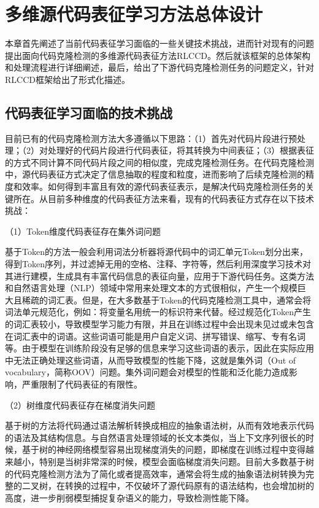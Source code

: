 \chapter{多维源代码表征学习方法总体设计}
\label{chap:design}

本章首先阐述了当前代码表征学习面临的一些关键技术挑战，进而针对现有的问题提出面向代码克隆检测的多维源代码表征方法RLCCD。然后就该框架的总体架构和处理流程进行详细阐述，最后，给出了下游代码克隆检测任务的问题定义，针对RLCCD框架给出了形式化描述。

\section{代码表征学习面临的技术挑战}
\label{sec:challenges}
目前已有的代码克隆检测方法大多遵循以下思路：（1）首先对代码片段进行预处理；（2）对处理好的代码片段进行代码表征，将其转换为中间表征；（3）根据表征的方式不同计算不同代码片段之间的相似度，完成克隆检测任务。在代码克隆检测中，源代码表征方式决定了信息抽取的程度和粒度，进而影响了后续克隆检测的精度和效率。如何得到丰富且有效的源代码表征表示，是解决代码克隆检测任务的关键所在。从目前多种维度的代码表征方法来看，现有的代码表征方式存在以下技术挑战：

（1）Token维度代码表征存在集外词问题

基于Token的方法一般会利用词法分析器将源代码中的词汇单元Token划分出来，得到Token序列，并过滤掉无用的空格、注释、字符等，然后利用深度学习技术对其进行建模，生成具有丰富代码信息的表征向量，应用于下游代码任务。这类方法和自然语言处理（NLP）领域中常用来处理文本的方式很相似，产生一个规模巨大且稀疏的词汇表。但是，在大多数基于Token的代码克隆检测工具中，通常会将词法单元规范化，例如：将变量名用统一的标识符来代替。经过规范化Token产生的词汇表较小，导致模型学习能力有限，并且在训练过程中会出现未见过或未包含在词汇表中的词语。这些词语可能是用户自定义词、拼写错误、缩写、专有名词等。由于模型在训练阶段没有足够的信息来学习这些词语的表示，因此在实际应用中无法正确处理这些词语，从而导致模型的性能下降，这就是集外词（Out of vocabulary，简称OOV）问题。集外词问题会对模型的性能和泛化能力造成影响，严重限制了代码表征的有限性。

（2）树维度代码表征存在梯度消失问题

基于树的方法将代码通过语法解析转换成相应的抽象语法树，从而有效地表示代码的语法及其结构信息。与自然语言处理领域的长文本类似，当上下文序列很长的时候，基于树的神经网络模型容易出现梯度消失的问题，即梯度在训练过程中变得越来越小，特别是当树非常深的时候，模型会面临梯度消失问题。目前大多数基于树的代码克隆检测方法为了简化或者提高效率，通常会将生成的抽象语法树转换为完整的二叉树，在转换的过程中，不仅破坏了源代码原有的语法结构，也会增加树的高度，进一步削弱模型捕捉复杂语义的能力，导致检测性能下降。

